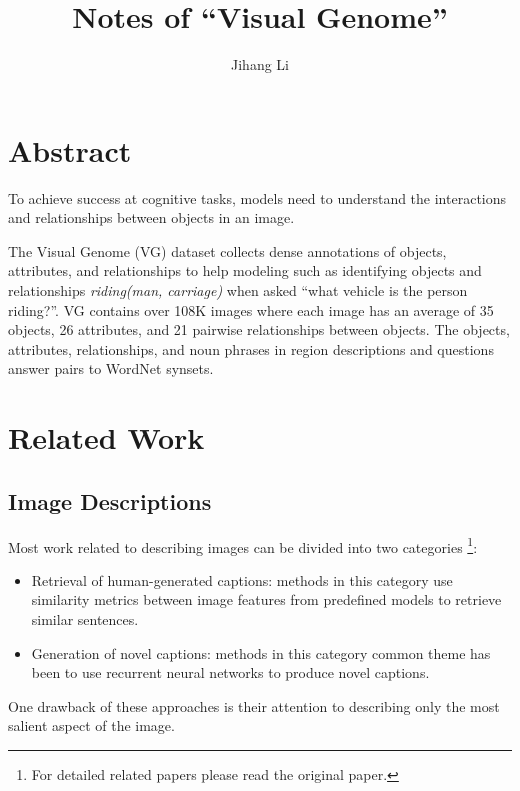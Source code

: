 \documentclass[10pt]{article}
\title{Notes of ``Visual Genome''}
\author{Jihang Li}
\begin{document}
\maketitle
\tableofcontents

\section*{Abstract}%
\label{sec:abstract}
To achieve success at cognitive tasks, models need to understand the
interactions and relationships between objects in an image.

The Visual Genome (VG) dataset collects dense annotations of objects,
attributes, and relationships to help modeling such as identifying objects and
relationships \textit{riding(man, carriage)} when asked ``what vehicle is the
person riding?''. VG contains over 108K images where each image has an average
of 35 objects, 26 attributes, and 21 pairwise relationships between objects.
The objects, attributes, relationships, and noun phrases in region descriptions
and questions answer pairs to WordNet synsets.

\setcounter{section}{2}
\section{Related Work}%
\label{sec:related}
\setcounter{subsection}{1}
\subsection{Image Descriptions}%
\label{sec:descriptions}
Most work related to describing images can be divided into two categories%
\footnote{For detailed related papers please read the original paper.}:
%
\begin{itemize}
  \item Retrieval of human-generated captions: methods in this category use
    similarity metrics between image features from predefined models to
    retrieve similar sentences.
  \item Generation of novel captions: methods in this category common theme has
    been to use recurrent neural networks to produce novel captions.
\end{itemize}

One drawback of these approaches is their attention to describing only the most
salient aspect of the image.
\end{document}
